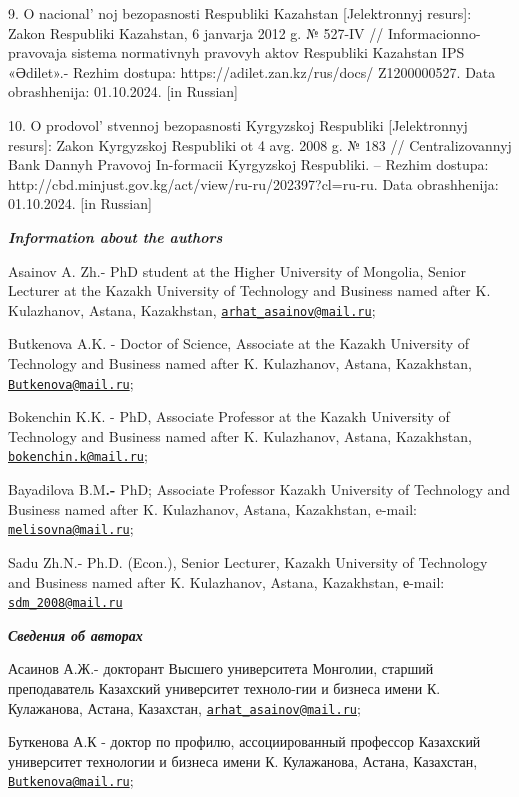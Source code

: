 {9. O nacional' noj bezopasnosti Respubliki Kazahstan
{[}Jelektronnyj resurs{]}: Zakon Respubliki Kazahstan, 6 janvarja 2012
g. № 527-IV // Informacionno-pravovaja sistema normativnyh pravovyh
aktov Respubliki Kazahstan IPS «Әdіlet».- Rezhim dostupa:
https://adilet.zan.kz/rus/docs/ Z1200000527. Data obrashhenija:
01.10.2024. {[}in Russian{]}

10. O prodovol' stvennoj bezopasnosti Kyrgyzskoj
Respubliki {[}Jelektronnyj resurs{]}: Zakon Kyrgyzskoj Respubliki ot 4
avg. 2008 g. № 183 // Centralizovannyj Bank Dannyh Pravovoj In-formacii
Kyrgyzskoj Respubliki. -- Rezhim dostupa:
http://cbd.minjust.gov.kg/act/view/ru-ru/202397?cl=ru-ru. Data
obrashhenija: 01.10.2024. {[}in Russian{]}

\emph{{\bfseries Information about the authors}}

Asainov A. Zh.- PhD student at the Higher University of Mongolia, Senior
Lecturer at the Kazakh University of Technology and Business named after
K. Kulazhanov, Astana, Kazakhstan,
\href{mailto:arhat_asainov@mail.ru}{\nolinkurl{arhat\_asainov@mail.ru}};

Butkenova A.K. - Doctor of Science, Associate at the Kazakh University
of Technology and Business named after K. Kulazhanov, Astana,
Kazakhstan,
\href{mailto:Butkenova@mail.ru}{\nolinkurl{Butkenova@mail.ru}};

Bokenchin K.K. - PhD, Associate Professor at the Kazakh University of
Technology and Business named after K. Kulazhanov, Astana, Kazakhstan,
\href{mailto:bokenchin.k@mail.ru}{\nolinkurl{bokenchin.k@mail.ru}};

Bayadilova B.M{\bfseries .-} PhD; Associate Professor Kazakh University of
Technology and Business named after K. Kulazhanov, Astana, Kazakhstan,
e-mail: \href{mailto:melisovna@mail.ru}{\nolinkurl{melisovna@mail.ru}};

Sadu Zh.N.- Ph.D. (Econ.), Senior Lecturer, Kazakh University of
Technology and Business named after K. Kulazhanov, Astana, Kazakhstan,
е-mail: \href{mailto:sdm_2008@mail.ru}{\nolinkurl{sdm\_2008@mail.ru}}

\emph{{\bfseries Сведения об авторах}}

Асаинов А.Ж.- докторант Высшего университета Монголии, старший
преподаватель Казахский университет техноло-гии и бизнеса имени К.
Кулажанова, Астана, Казахстан,
\href{mailto:arhat_asainov@mail.ru}{\nolinkurl{arhat\_asainov@mail.ru}};

Буткенова А.К - доктор по профилю, ассоциированный профессор Казахский
университет технологии и бизнеса имени К. Кулажанова, Астана, Казахстан,
\href{mailto:Butkenova@mail.ru}{\nolinkurl{Butkenova@mail.ru}};

}
